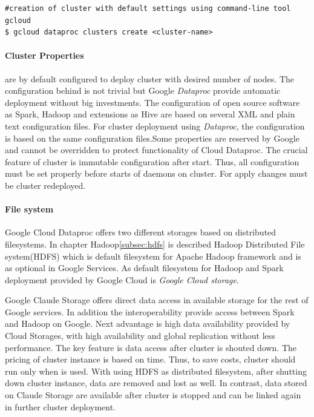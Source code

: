 \documentclass[a4paper,12pt,oneside]{report}
\begin{document}
\begin{footnotesize}
\begin{lstlisting}[style=mybash]
#creation of cluster with default settings using command-line tool gcloud
$ gcloud dataproc clusters create <cluster-name>
\end{lstlisting}
\end{footnotesize}
 

\paragraph{Cluster Properties} are by default configured to deploy cluster with desired 
number of nodes. The configuration behind is not trivial but Google \textit{Dataproc} provide 
automatic deployment without big investments. The 
configuration of open source software as Spark, Hadoop  and extensions as Hive are based 
on several XML and plain text configuration files. For cluster deployment 
using \textit{Dataproc}, the configuration is based on the same configuration files.Some 
properties are reserved by Google and cannot be overridden 
to protect functionality of Cloud Dataproc. The crucial feature of cluster is immutable 
configuration after start. Thus, all configuration must be set 
properly before starts of daemons on cluster. For apply changes must be cluster redeployed. 

\paragraph{File system}
Google Cloud Dataproc offers two different storages based on distributed filesystems. In 
chapter Hadoop\ref{subsec:hdfs} is described Hadoop Distributed File system(HDFS) which is 
default filesystem for Apache Hadoop framework and is as optional in Google Services. As 
default filesystem for Hadoop and Spark deployment provided by Google Cloud is \textit{Google Cloud storage}. 

Google Claude Storage offers direct data access in available storage for the rest of Google 
services. In addition the interoperability provide access between Spark and Hadoop on Google. 
Next advantage is high data availability provided by Cloud
 Storages, with high availability and global replication without less performance. The key 
 feature is data access after cluster is shouted down. The 
pricing of cluster instance is based on time. Thus, to save costs, cluster should run only when 
is used. With using HDFS as distributed filesystem, after 
shutting down cluster instance, data are removed and lost as well. In contrast, data stored on 
Claude Storage are available after cluster is stopped and 
can be linked again in further cluster deployment.
\end{document}
